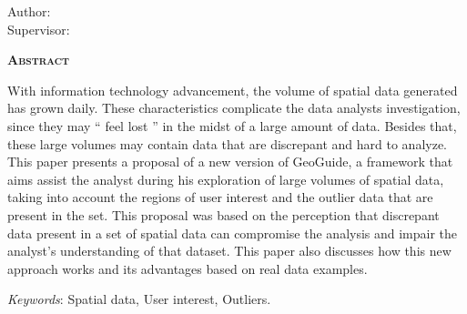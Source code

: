 \begin{center}
	{\Large{\textbf{\thesistitle}}}
\end{center}

\vspace{1cm}

\begin{flushright}
	Author: \thesisauthor\\
	Supervisor: \thesissupervisor
\end{flushright}

\vspace{1cm}

\begin{center}
	\Large{\textsc{\textbf{Abstract}}}
\end{center}

\noindent With information technology advancement, the volume of spatial data generated has grown daily. These characteristics complicate the data  analysts investigation, since they may `` feel lost '' in the midst of a large amount of data. Besides that, these large volumes may contain data that are discrepant and hard to analyze. This paper presents a proposal of a new version of GeoGuide, a framework that aims assist the analyst during his exploration of large volumes of spatial data, taking into account the regions of user interest and the outlier data that are present in the set. This proposal was based on the perception that discrepant data present in a set of spatial data can compromise the analysis and impair the analyst's understanding of that dataset. This paper also discusses how this new approach works and its advantages based on real data examples.

\noindent\textit{Keywords}: Spatial data, User interest, Outliers.